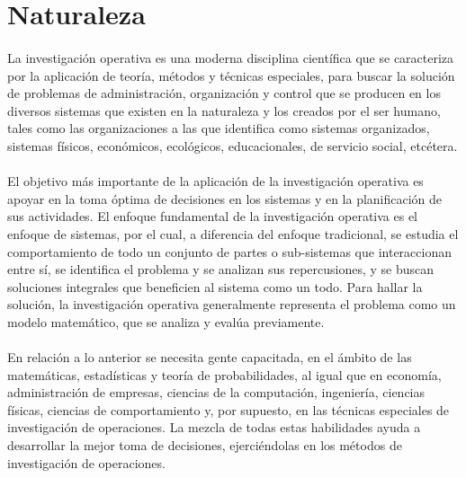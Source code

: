\documentclass[10pt, a4paper,spanish]{article}
\begin{document}
			
	\section{Naturaleza}
		\paragraph{}
		La investigación operativa es una moderna disciplina científica que se caracteriza por la aplicación de teoría, métodos y técnicas especiales, para buscar la solución de problemas de administración, organización y control que se producen en los diversos sistemas que existen en la naturaleza y los creados por el ser humano, tales como las organizaciones a las que identifica como sistemas organizados, sistemas físicos, económicos, ecológicos, educacionales, de servicio social, etcétera.\cite{wikipedia_IO}

		\paragraph{}
		El objetivo más importante de la aplicación de la investigación operativa es apoyar en la toma óptima de decisiones en los sistemas y en la planificación de sus actividades. El enfoque fundamental de la investigación operativa es el enfoque de sistemas, por el cual, a diferencia del enfoque tradicional, se estudia el comportamiento de todo un conjunto de partes o sub-sistemas que interaccionan entre sí, se identifica el problema y se analizan sus repercusiones, y se buscan soluciones integrales que beneficien al sistema como un todo. Para hallar la solución, la investigación operativa generalmente representa el problema como un modelo matemático, que se analiza y evalúa previamente.\cite{wikipedia_IO}
		
		\paragraph{}
		En relación a lo anterior se necesita gente capacitada, en el ámbito de las matemáticas, estadísticas y teoría de probabilidades, al igual que en economía, administración de empresas, ciencias de la computación, ingeniería, ciencias físicas, ciencias de comportamiento y, por supuesto, en las técnicas especiales de investigación de operaciones. La mezcla de todas estas habilidades ayuda a desarrollar la mejor toma de decisiones, ejerciéndolas en los métodos de investigación de operaciones.\cite{gestiopolis_IO}
\end{document}
